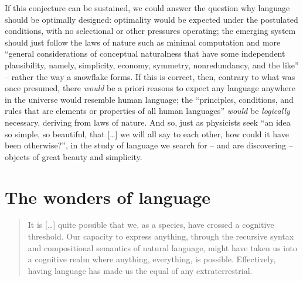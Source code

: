 \documentclass[output=paper]{langsci/langscibook}
\begin{document}
If this conjecture can be sustained, we could answer the question why language
should be optimally designed: optimality would be expected under the postulated
conditions, with no selectional or other pressures operating; the emerging
system should just follow the laws of nature such as minimal computation and
more “general considerations of conceptual naturalness that have some
independent plausibility, namely, simplicity, economy, symmetry, nonredundancy,
and the like” – rather the way a snowflake forms. If this is correct, then,
contrary to what was once presumed, there \emph{would} be a priori 
reasons to expect any language anywhere in the universe would
resemble human language; the “principles, conditions, and rules that are
elements or properties of all human languages” \emph{would} be \emph{logically}
necessary, deriving from laws of nature. And so, just as physicists seek “an
idea so simple, so beautiful, that […] we will all say to each other, how could
it have been otherwise?”, in the study of language we search for – and are
discovering – objects of great beauty and simplicity.

\section{The wonders of language}

\begin{quote}
It is […] quite possible that we, as a species, have crossed a cognitive
thre\-shold. Our capacity to express anything, through the recursive syntax and
compositional semantics of natural language, might have taken us into a
cognitive realm where anything, everything, is possible. Effectively, having
language has made us the equal of any extraterrestrial.\\\hbox{}\hfill%
\hbox{\parencite[181--182]{Roberts2017}}
\end{quote}
\end{document}
